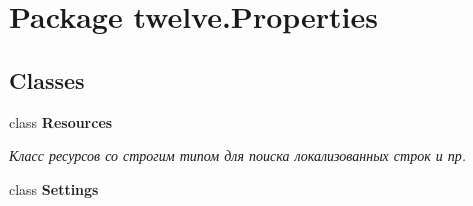 \hypertarget{namespacetwelve_1_1_properties}{}\section{Package twelve.\+Properties}
\label{namespacetwelve_1_1_properties}
\subsection*{Classes}
\begin{DoxyCompactItemize}
\item 
class {\bfseries Resources}
\begin{DoxyCompactList}\small\item\em Класс ресурсов со строгим типом для поиска локализованных строк и пр. \end{DoxyCompactList}\item 
class {\bfseries Settings}
\end{DoxyCompactItemize}
